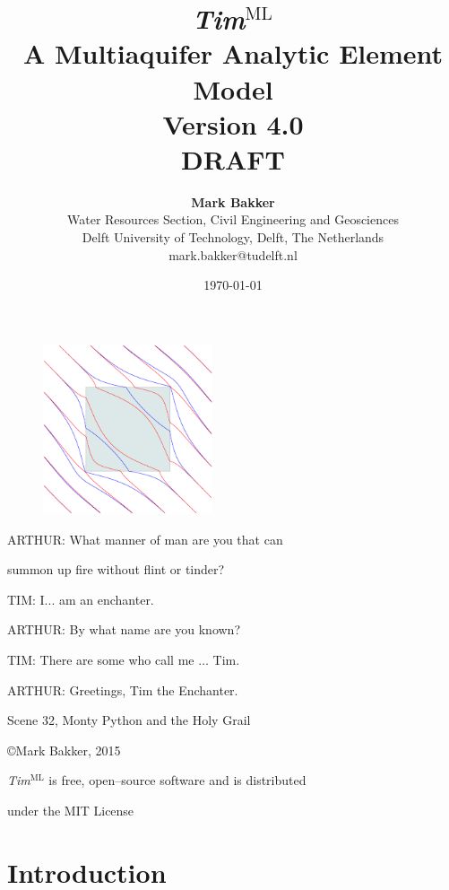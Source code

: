 \documentclass [10pt,letterpaper] {article}
\begin{document}
\def\Tim{{\it Tim}$^{\text{ML}}$}
\def\Timsp{{\it Tim}$^{\text{ML}}$ }

\title{{\it Tim}$^{\text{ML}}$\\A Multiaquifer Analytic Element Model\\Version 4.0\\DRAFT}
\author{{\bf Mark Bakker}\\Water Resources Section, Civil Engineering and Geosciences\\
Delft University of Technology, Delft, The Netherlands
\\mark.bakker@tudelft.nl
}
\date{\today}
\maketitle

\begin{figure}[h]
\centering
\includegraphics[width=5cm,draft=false]{frontpic.eps}
\end{figure}

\centerline{ARTHUR:
    What manner of man are you that can }
\centerline{\hspace{2cm} summon up   fire without flint or tinder?}
 \centerline{TIM:  I... am an enchanter.}
\centerline{ARTHUR: By what name are you known?} \centerline{TIM:
There are some who call me $\hdots$ Tim.} \centerline{ARTHUR:
Greetings, Tim the Enchanter. } \centerline{\footnotesize Scene
32, Monty Python and the Holy Grail}

\vskip 1cm
\centerline{\copyright Mark Bakker, 2015}
\centerline{\Timsp is free, open--source software and is distributed}
\centerline{under the MIT
License}

\newpage
\tableofcontents

\newpage
\section{Introduction}
\end{document}

